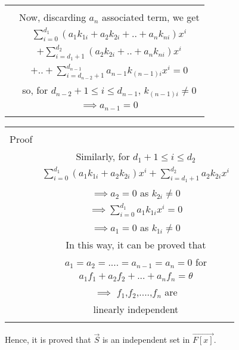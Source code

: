 \documentclass[journal,12pt,twocolumn]{IEEEtran}
\renewcommand\thesection{\arabic{section}}
\begin{document}
\begin{table}[h!]
\begin{center}
\begin{tabular}{|c|c|}
& \\
& Now, discarding $a_n$ associated term, we get\\
& $\sum_{i=0}^{d_1}(a_1k_{1i}+a_2k_{2i}+..+a_nk_{ni})x^i$\\
& $+\sum_{i=d_1+1}^{d_2}(a_2k_{2i}+..+a_nk_{ni})x^i$\\
& $+..+\sum_{i=d_{n-2}+1}^{d_{n-1}}a_{n-1}k_{(n-1)i}x^i =0$\\
& so, for $d_{n-2}+1\leq i \leq d_{n-1}$, $k_{(n-1)i}\neq 0$\\
& $\implies a_{n-1}=0$ \\
& \\
\hline
\end{tabular}
\end{center}
\end{table}

\begin{table}[h!]
\begin{center}
\begin{tabular}{|c|c|}
\hline
& \\
Proof & \\
& Similarly, for $d_1+1 \leq i \leq d_2$\\
& $\sum_{i=0}^{d_1}(a_1k_{1i}+a_2k_{2i})x^i + \sum_{i=d_1+1}^{d_2}a_2k_{2i}x^i$\\
& $\implies a_2=0$ as $k_{2i} \neq 0$\\
& $\implies \sum_{i=0}^{d_1}a_1k_{1i}x^i=0$\\
& $\implies a_1=0$ as $k_{1i} \neq 0$\\
& In this way, it can be proved that\\
& $a_1=a_2=....=a_{n-1}=a_n=0$ for\\
& $a_1f_1+a_2f_2+...+a_nf_n=\theta$\\
& $\implies$ $f_1$,$f_2$,....,$f_n$ are\\
& linearly independent\\
& \\
\hline
\end{tabular}
\end{center}
\end{table}


Hence, it is proved that $\vec{S}$ is an independent set in $\vec{F[x]}$.
\end{document}
